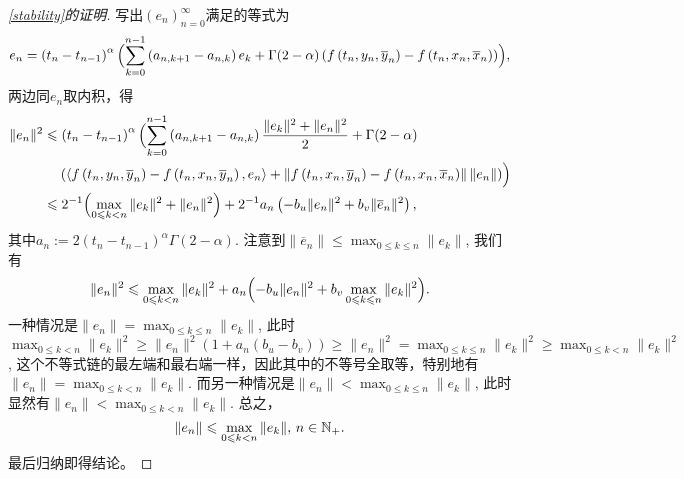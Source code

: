 \begin{proof}[\cref{stability}的证明]
    写出$\left(e_n\right)_{n=0}^\infty$满足的等式为
    \begin{equation*}
        e_n=\left(t_n-t_{n-1}\right)^\alpha\Bigl(\sum_{k=0}^{n-1}\left(a_{n,k+1}-a_{n,k}\right)e_k+\Gamma(2-\alpha)\left(f\left(t_n,y_n,\overline y_n\right)-f\left(t_n,x_n,\overline x_n\right)\right)\Bigr),
    \end{equation*}
    两边同$e_n$取内积，得
    \begin{align*}
        \|e_n\|^2&\leqslant\left(t_n-t_{n-1}\right)^\alpha\Bigl(\sum_{k=0}^{n-1}\left(a_{n,k+1}-a_{n,k}\right)\frac{\|e_k\|^2+\|e_n\|^2}{2}+\Gamma(2-\alpha)
        \\& \relphantom{=}\left(\left<f\left(t_n,y_n,\overline y_n\right)-f\left(t_n,x_n,\overline y_n\right),e_n\right>+\left\|f\left(t_n,x_n,\overline y_n\right)-f\left(t_n,x_n,\overline x_n\right)\right\|\left\|e_n\right\|\right)\Bigr)
        \\&\leqslant 2^{-1}\Bigl(\max_{0\leqslant k<n} \|e_k\|^2 + \|e_n\|^2\Bigr)
        +2^{-1}a_n\left(-b_u \|e_n\|^2+b_v \|\overline e_n\|^2\right),
    \end{align*}
    其中$a_n:=2\left(t_n-t_{n-1}\right)^\alpha\Gamma(2-\alpha)$. 注意到$\|\overline e_n\|\leqslant \max_{0\leqslant k\leqslant n} \|e_k\|$, 我们有
    \begin{equation*}
        \|e_n\|^2\leqslant \max_{0\leqslant k<n} \|e_k\|^2+a_n\Bigl(-b_u \|e_n\|^2+b_v \max_{0\leqslant k\leqslant n} \|e_k\|^2\Bigr).
    \end{equation*}
    一种情况是$\|e_n\|=\max_{0\leqslant k\leqslant n} \|e_k\|$, 此时$\max_{0\leqslant k<n} \|e_k\|^2 \geqslant \|e_n\|^2 (1+ a_n(b_u-b_v))\geqslant \|e_n\|^2=\max_{0\leqslant k\leqslant n} \|e_k\|^2\geqslant \max_{0\leqslant k<n} \|e_k\|^2$, 这个不等式链的最左端和最右端一样，因此其中的不等号全取等，特别地有$\|e_n\|=\max_{0\leqslant k<n} \|e_k\|$. 而另一种情况是$\|e_n\|<\max_{0\leqslant k\leqslant n} \|e_k\|$, 此时显然有$\|e_n\|<\max_{0\leqslant k< n} \|e_k\|$. 总之，
    \begin{equation*}
        \|e_n\|\leqslant\max_{0\leqslant k< n} \|e_k\|,\,n\in\mathbb{N_+}.
    \end{equation*}
    最后归纳即得结论。
\end{proof}